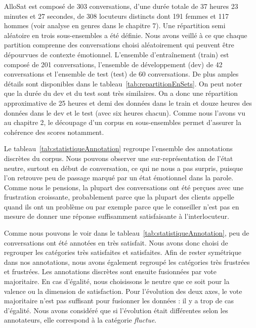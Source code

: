 

AlloSat est composé de 303 conversations, d'une durée totale de 37 heures 23 minutes et 27 secondes, de 308 locuteurs distincts dont 191 femmes et 117 hommes (voir analyse en genres dans le chapitre 7).
Une répartition semi aléatoire en trois sous-ensembles a été définie. Nous avons veillé à ce que chaque partition comprenne des conversations choisi aléatoirement qui peuvent être dépourvues de contexte émotionnel. L'ensemble d’entraînement (train) est composé de 201 conversations, l'ensemble de développement (dev) de 42 conversations et l'ensemble de test (test) de 60 conversations. De plus amples détails sont disponibles dans le tableau~\ref{tab:repartitionEnSets}.
On peut noter que la durée du dev et du test sont très similaires. On a donc une répartition approximative de 25 heures et demi des données dans le train et douze heures des données dans le dev et le test (avec six heures chacun). Comme nous l'avons vu au chapitre 2, le découpage d'un corpus en sous-ensembles permet d'assurer la cohérence des scores notamment.



Le tableau~\ref{tab:statistiqueAnnotation} regroupe l'ensemble des annotations discrètes du corpus. Nous pouvons observer une sur-représentation de l'état neutre, surtout en début de conversation, ce qui ne nous a pas surpris, puisque l'on retrouve peu de passage marqué par un état émotionnel dans la parole. Comme nous le pensions, la plupart des conversations ont été perçues avec une frustration croissante, probablement parce que la plupart des clients appelle quand ils ont un problème ou par exemple parce que le conseiller n’est pas en mesure de donner une réponse suffisamment satisfaisante à l’interlocuteur.

Comme nous pouvons le voir dans le tableau~\ref{tab:statistiqueAnnotation}, peu de conversations ont été annotées en très satisfait. Nous avons donc choisi de regrouper les catégories très satisfaites et satisfaites. Afin de rester symétrique dans nos annotations, nous avons également regroupé les catégories très frustrées et frustrées. Les annotations discrètes sont ensuite fusionnées par vote majoritaire. En cas d'égalité,
nous choisissons le neutre que ce soit pour la valence ou la dimension de satisfaction. Pour l'évolution des deux axes, le vote majoritaire n'est pas suffisant pour fusionner les données : il y a trop de cas d'égalité. Nous avons considéré que si l'évolution était différentes selon les annotateurs, elle correspond à la catégorie \textit{fluctue}.


